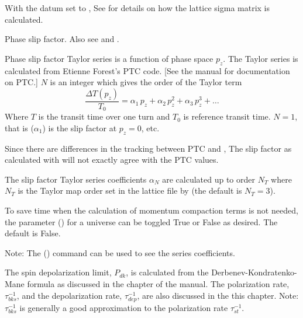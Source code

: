 \begin{description}
{{{{{{With the datum  set to , See  for details on how the
lattice sigma matrix is calculated.

  \item[slip_factor_ptc.$N$, $N = 1, 2, 3, \ldots$] \Newline {}
Phase slip factor. Also see  and .

Phase slip factor Taylor series is a function of phase space $p_z$. The Taylor series is calculated
from Etienne Forest's PTC code. [See the \bmad manual for documentation on PTC.] $N$ is an integer
which gives the order of the Taylor term
\begin{equation}
  \frac{\Delta T(p_z)}{T_0} = \alpha_1 \, p_z + \alpha_2 \, p_z^2 + \alpha_3 \, p_z^3 + \ldots
\end{equation}
Where $T$ is the transit time over one turn and $T_0$ is reference transit time.
$N = 1$, that is  ($\alpha_1$) is the slip factor at $p_z = 0$, etc.

Since there are differences in the tracking between PTC and \bmad, The slip factor as calculated
with \bmad will not exactly agree with the PTC values.

The slip factor Taylor series coefficients $\alpha_N$ are calculated up to order $N_T$ where $N_T$ is the
Taylor map order set in the lattice file by  (the default is $N_T=3$). 

To save time when the calculation of momentum compaction terms is not needed, the  parameter
() for a universe can be toggled True or False as desired. The default is False.

Note: The  () command can be used to see the series coefficients.

  \item[spin.polarization_limit, .polarization_rate, .depolarization_rate] \Newline {}
The spin depolarization limit, $P_{dk}$, is calculated from the Derbenev-Kondratenko-Mane formula as
discussed in the  chapter of the \bmad manual.  The 
polarization rate, $\tau_{bks}^{-1}$, and the depolarization rate, $\tau_{dep}^{-1}$, are also
discussed in the this chapter. Note: $\tau_{bks}^{-1}$ is generally a good approximation to the
 polarization rate $\tau_{st}^{-1}$.

}}}}}}
\end{description}
